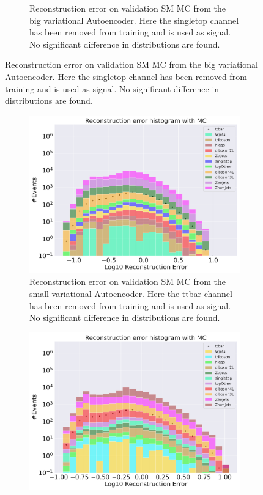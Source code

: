 \begin{figure}[h!]
\begin{subfigure}{.45\textwidth}
        \caption{Reconstruction error on validation SM MC from the big variational Autoencoder. Here the singletop channel has been removed from training and 
        is used as signal. No significant difference in distributions are found. }
        \label{fig:vae_big_singletop}
    \end{subfigure}
    \hfill 
    \label{fig:vae_big_channel_2}
\end{figure}

\begin{figure}[h!]
    \centering
    \begin{subfigure}{.45\textwidth}
        \includegraphics[width=\textwidth]{Figures/VAE_testing/small/b_data_recon_big_rm3_feats_sig_ttbar.pdf}
        \caption{Reconstruction error on validation SM MC from the small variational Autoencoder. Here the ttbar channel has been removed from training and 
        is used as signal. No significant difference in distributions are found. }
        \label{fig:vae_small_ttbar}
    \end{subfigure}
    \hfill 
    \begin{subfigure}{.45\textwidth}
        \includegraphics[width=\textwidth]{Figures/VAE_testing/big/b_data_recon_big_rm3_feats_sig_ttbar.pdf}

\end{subfigure}
\end{figure}
